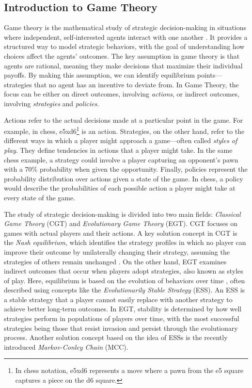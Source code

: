 \subsection{Introduction to Game Theory}

    Game theory is the mathematical study of strategic decision-making in situations where independent, self-interested agents interact with one another \cite{Shoham_Leyton-Brown_2008}. It provides a structured way to model strategic behaviors, with the goal of understanding how choices affect the agents' outcomes. The key assumption in game theory is that agents are rational, meaning they make decisions that maximize their individual payoffs. By making this assumption, we can identify equilibrium points—strategies that no agent has an incentive to deviate from. In Game Theory, the focus can be either on direct outcomes, involving \emph{actions}, or indirect outcomes, involving \emph{strategies} and \emph{policies}.\tinydouble

    \noindent
    Actions refer to the actual decisions made at a particular point in the game. For example, in chess, e5xd6\footnote{In chess notation, e5xd6 represents a move where a pawn from the e5 square captures a piece on the d6 square.} is an action. Strategies, on the other hand, refer to the different ways in which a player might approach a game—often called \emph{styles of play}. They define tendencies in actions that a player might take. In the same chess example, a strategy could involve a player capturing an opponent's pawn with a 70\% probability when given the opportunity. Finally, policies represent the probability distribution over actions given a state of the game. In chess, a policy would describe the probabilities of each possible action a player might take at every state of the game.\tinydouble

    \noindent
    The study of strategic decision-making is divided into two main fields: \emph{Classical Game Theory} (CGT) and \emph{Evolutionary Game Theory} (EGT). CGT focuses on games with actual players and their actions. A key solution concept in CGT is the \emph{Nash equilibrium}, which identifies the strategy profiles in which no player can improve their outcome by unilaterally changing their strategy, assuming the strategies of others remain unchanged \cite{doi:10.1073/pnas.36.1.48}. On the other hand, EGT examines indirect outcomes that occur when players adopt strategies, also known as styles of play. Here, equilibrium is based on the evolution of behaviors over time \cite{Szab__2007}, often described using concepts like the \emph{Evolutionarily Stable Strategy} (ESS). An ESS is a stable strategy that a player cannot easily replace with another strategy to achieve better long-term outcomes. In EGT, stability is determined by how well strategies perform in populations of players over time, with the most successful strategies being those that resist invasion and persist through the evolutionary process. Another solution concept based on the idea of ESSs is the recently introduced \emph{Markov-Conley Chain} (MCC).\tinydouble

